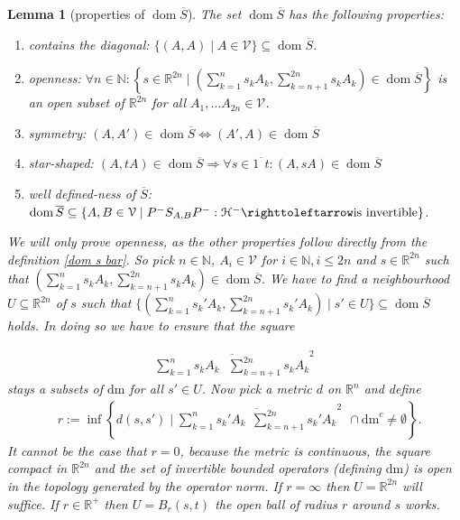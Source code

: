 \documentclass[b5paper,draft,openbib,12pt]{memoir}
\newtheorem{Lemma}[Def]{Lemma}
\DeclareMathOperator{\dom}{dom}
\begin{document}
\begin{Lemma}[properties of \(\dom\overline{S}\)]\label{lem properties of dom s bar}
The set \(\dom \overline{S}\) has the following properties:
\begin{enumerate}
\item contains the diagonal: \(\{(A,A)\mid A\in\mathcal{V}\}\subseteq \dom\overline{S}\).
\item openness: \(\forall n \in \mathbb{N}: \left\{s\in\mathbb{R}^{2n}\mid \left(\sum_{k=1}^n s_k A_k,\sum_{k=n+1}^{2n} s_{k} A_{k} \right)\in \dom\overline{S}\right\}\) is an open subset of \(\mathbb{R}^{2n}\) for all \(A_1,\dots A_{2n}\in\mathcal{V}\).
\item symmetry:  \((A,A')\in\dom\overline{S}\iff (A',A)\in\dom\overline{S}\)
\item star-shaped: \((A,t A)\in \dom\overline{S}\Rightarrow \forall s\in \overline{1~~t} : (A,s A)\in\dom\overline{S}\)
\item well defined-ness of \(\overline{S}\): \(\dom\overline{S}\subseteq \{A,B\in\mathcal{V}\mid P^- S_{A,B} P^-:\mathcal{H}^- \righttoleftarrow \text{is invertible} \}\).
\end{enumerate}
We will only prove openness, as the other properties follow directly from the definition \eqref{dom s bar}. So pick \(n\in\mathbb{N}\), 
\(A_i\in\mathcal{V}\) for \(i\in \mathbb{N}, i\le 2 n\) and \(s\in\mathbb{R}^{2n}\)
such that \(\left(\sum_{k=1}^n s_k A_k,\sum_{k=n+1}^{2n} s_{k} A_{k} \right)\in\dom\overline{S}\). 
We have to find a neighbourhood \(U\subseteq \mathbb{R}^{2n}\) of \(s\) such that 
\(\{ \left(\sum_{k=1}^n s_k' A_k,\sum_{k=n+1}^{2n} s_{k}' A_{k} \right) \mid s'\in U\}\subseteq \dom\overline{S}\) holds. 
In doing so we have to ensure that the square

\begin{align}
  \overline{\sum_{k=1}^n s_k A_k~~~\sum_{k=n+1}^{2n} s_{k} A_{k} }^2
\end{align}
stays a subsets of \(\mathrm{dm}\) for all \(s'\in U\). 
Now pick a metric \(d\) on \(\mathbb{R}^n\) and define 
\begin{align}\nonumber
&r:=\inf \left\{d(s,s')\mid \overline{\sum_{k=1}^n s_k' A_k~~\sum_{k=n+1}^{2n} s_k' A_k }^2 ~~\cap \mathrm{dm}^c\neq \emptyset \right\}.
\end{align}
It cannot be the case that \(r=0\), because the 
metric is continuous, the square compact in 
\(\mathbb{R}^{2n}\) 
and the set of invertible bounded operators 
(defining \(\mathrm{dm}\)) is open in the topology 
generated by the operator norm.
If \(r=\infty\) then \(U=\mathbb{R}^{2n}\) will 
suffice. If \(r\in\mathbb{R}^+\) then \(U=B_r(s,t)\) 
the open ball of radius \(r\) around \(s\) works.
\end{Lemma}
\end{document}
